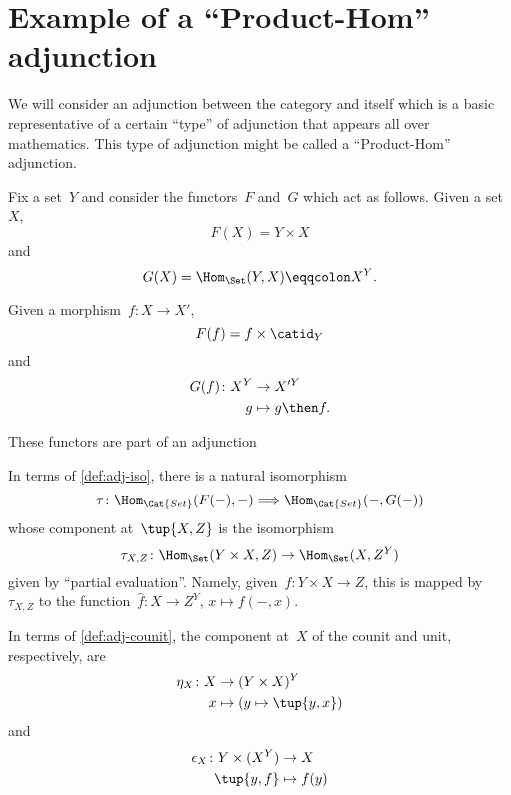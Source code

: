 \section{Example of a ``Product-Hom'' adjunction}
We will consider an adjunction between the category \Set and itself which is a basic representative of a certain ``type'' of adjunction that appears all over mathematics. This type of adjunction might be called a ``Product-Hom'' adjunction.


Fix a set~$Y$ and consider the functors~$F$ and~$G$ which act as follows. Given a set~$X$,
\begin{equation*}
  F(X) = Y \times X
\end{equation*}
and
\begin{equation*}
  G(X) = \Hom_{\Set}(Y, X) \eqqcolon X^Y.
\end{equation*}

Given a morphism~$f\colon X \to X'$,
\begin{equation*}
  F(f) = f \times \catid_Y
\end{equation*}
and
\begin{equation*}
  \begin{aligned}
    G(f)\colon X^Y &\to X'^Y\\
    g &\mapsto g \then f.
  \end{aligned}
\end{equation*}

These functors are part of an adjunction

\begin{center}
\end{center}
In terms of \cref{def:adj-iso}, there is a natural isomorphism
\begin{equation*}
  \tau\colon \Hom_{\Cat{Set}}(F(- ), - )  \Longrightarrow  \Hom_{\Cat{Set}}(- , G( - ))
\end{equation*}
whose component at~$\tup{X,Z}$ is the isomorphism
\begin{equation*}
  \tau_{X,Z} \colon \Hom_{\Set}(Y \times X, Z) \to \Hom_{\Set}(X, Z^Y)
\end{equation*}
given by ``partial evaluation''. Namely, given~$f\colon Y \times X \to Z$,  this is mapped by~$\tau_{X,Z}$ to the function~$\hat f\colon X \to Z^Y$, $x \mapsto f( -, x)$.

In terms of \cref{def:adj-counit}, the component at~$X$ of the counit and unit, respectively, are
\begin{equation*}
  \begin{aligned}
    \eta_X \colon X &\to  (Y \times X)^Y\\
    x &\mapsto (y \mapsto \tup{y,x})
  \end{aligned}
\end{equation*}
and
\begin{equation*}
  \begin{aligned}
    \epsilon_X \colon Y \times (X^Y) &\to X\\
    \tup{y,f} &\mapsto f(y)
  \end{aligned}
\end{equation*}
